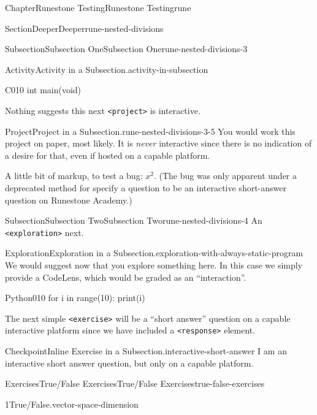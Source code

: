 \documentclass[oneside,10pt,]{book}
\newcommand{\mono}[1]{\texttt{#1}}
\numberwithin{equation}{section}
\begin{document}
\begin{chapterptx}{Chapter}{Runestone Testing}{}{Runestone Testing}{}{}{rune}
\begin{sectionptx}{Section}{Deeper}{}{Deeper}{}{}{rune-nested-divisions}
\begin{subsectionptx}{Subsection}{Subsection One}{}{Subsection One}{}{}{rune-nested-divisions-3}
\begin{activity}{Activity}{Activity in a Subsection.}{activity-in-subsection}
\begin{program}{C}{0}{1}{0}
int main(void)
\end{program}
\end{activity}%
Nothing suggests this next \mono{<project>} is interactive.%
\begin{project}{Project}{Project in a Subsection.}{rune-nested-divisions-3-5}%
You would work this project on paper, most likely.  It is \emph{never} interactive since there is no indication of a desire for that, even if hosted on a capable platform.%
\par
A little bit of markup, to test a bug: \(x^2\).  (The bug was only apparent under a deprecated method for specify a question to be an interactive short-answer question on Runestone Academy.)%
\end{project}%
\end{subsectionptx}
%
%
\typeout{************************************************}
\typeout{************************************************}
%
\begin{subsectionptx}{Subsection}{Subsection Two}{}{Subsection Two}{}{}{rune-nested-divisions-4}
An \mono{<exploration>} next.%
\begin{exploration}{Exploration}{Exploration in a Subsection.}{exploration-with-always-static-program}%
We would suggest now that you explore something here.  In this case we simply provide a CodeLens, which would be graded as an ``interaction''.%
\begin{program}{Python}{0}{1}{0}
for i in range(10):
    print(i)
\end{program}
\end{exploration}%
The next simple \mono{<exercise>} will be a ``short answer'' question on a capable interactive platform since we have included a \mono{<response>} element.%
\begin{inlineexercise}{Checkpoint}{Inline Exercise in a Subsection.}{interactive-short-answer}%
I am an interactive short answer question, but only on a capable platform.%
\end{inlineexercise}%
\end{subsectionptx}
\end{sectionptx}
%
%
\typeout{************************************************}
\typeout{************************************************}
%
\begin{exercises-section}{Exercises}{True\slash{}False Exercises}{}{True\slash{}False Exercises}{}{}{true-false-exercises}
\begin{divisionexercise}{1}{True\slash{}False.}{}{vector-space-dimension}%

\end{divisionexercise}
\end{exercises-section}
\end{chapterptx}
\end{document}
